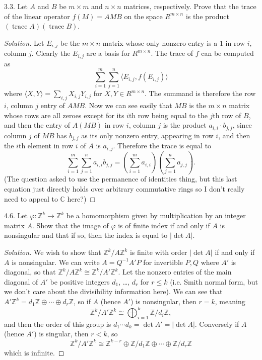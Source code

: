 \documentclass[10pt]{scrartcl}
\providecommand{\CC}{\mathbb C}
\providecommand{\ZZ}{\mathbb Z}
\providecommand{\inv}{^{-1}}
\newenvironment{soln}{\begin{proof}[Solution]}{\end{proof}}
\begin{document}
\begin{problem*}3.3.
	Let $A$ and $B$ be $m\times m$ and $n\times n$ matrices, respectively.
	Prove that the trace of the linear operator $f(M) = AMB$
	on the space $R^{m\times n}$ is the product
	$(\operatorname{trace}A)(\operatorname{trace}B)$.
\end{problem*}

\begin{soln}
	Let $E_{i,j}$ be the $m\times n$ matrix whose only nonzero entry
	is a $1$ in row $i$, column $j$.
	Clearly the $E_{i,j}$ are a basis for $R^{m\times n}$.
	The trace of $f$ can be computed as
	\[\sum_{i=1}^m\sum_{j=1}^n \langle E_{i,j}, f(E_{i,j})\rangle\]
	where $\langle X, Y\rangle = \sum_{i,j} X_{i,j}Y_{i,j}$
	for $X,Y\in R^{m\times n}$. The summand is therefore
	the row $i$, column $j$ entry of $AMB$. Now we can see easily that
	$MB$ is the $m\times n$ matrix whose rows are all zeroes
	except for its $i$th row being equal to the $j$th row of $B$,
	and then the entry of $A(MB)$ in row $i$, column $j$ is
	the product $a_{i,i}\cdot b_{j,j}$,
	since column $j$ of $MB$ has $b_{j,j}$ as its only nonzero entry,
	appearing in row $i$, and then the $i$th element in row $i$
	of $A$ is $a_{i,j}$. Therefore the trace is equal to
	\[\sum_{i=1}^m\sum_{j=1}^n a_{i,i}b_{j,j} =
	\left(\sum_{i=1}^ma_{i,i}\right)\left(\sum_{j=1}^na_{j,j}\right).\]
	(The question asked to use the permanence of identities thing,
	but this last equation just directly holds over arbitrary commutative rings
	so I don't really need to appeal to $\CC$ here?)
\end{soln}

\begin{problem*}4.6.
	Let $\varphi\colon\ZZ^k\to\ZZ^k$ be a homomorphism
	given by multiplication by an integer matrix $A$.
	Show that the image of $\varphi$ is of finite index
	if and only if $A$ is nonsingular and that
	if so, then the index is equal to $|\det A|$.
\end{problem*}
 
\begin{soln}
	We wish to show that $\ZZ^k/A\ZZ^k$ is finite with order $|\det A|$
	if and only if $A$ is nonsingular. We can write $A = Q\inv A'P$
	for invertible $P,Q$ where $A'$ is diagonal,
	so that $\ZZ^k/A\ZZ^k\cong\ZZ^k/A'\ZZ^k$. Let the nonzero entries
	of the main diagonal of $A'$ be positive integers $d_1$, \dots, $d_r$
	for $r\le k$ (i.e. Smith normal form, but we don't care about
	the divisibility information here). We can see that
	$A'\ZZ^k = d_1\ZZ\oplus\cdots\oplus d_r\ZZ$,
	so if $A$ (hence $A'$) is nonsingular, then $r = k$, meaning
	\[\ZZ^k/A'\ZZ^k \cong \bigoplus_{i=1}^k \ZZ/d_i\ZZ,\]
	and then the order of this group is $d_1\cdots d_k = \det A' = |\det A|$.
	Conversely if $A$ (hence $A'$) is singular, then $r<k$, so
	\[\ZZ^k/A'\ZZ^k\cong\ZZ^{k-r}\oplus\ZZ/d_1\ZZ\oplus\cdots\oplus \ZZ/d_r\ZZ\]
	which is infinite.
\end{soln}
\end{document}
